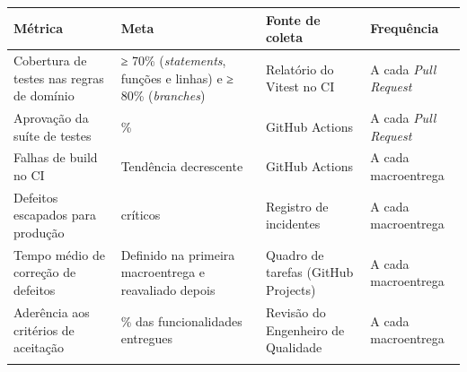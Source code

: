 {\footnotesize
\begin{tabularx}{\textwidth}{>{\hsize=1.229\hsize\sloppy\arraybackslash}X >{\hsize=1.127\hsize\sloppy\arraybackslash}X >{\hsize=0.917\hsize\sloppy\arraybackslash}X >{\hsize=0.726\hsize\sloppy\arraybackslash}X}
\arrayrulecolor{GithubTableBorder}\toprule
\rowcolor{BrandTableHeader}
\textbf{Métrica} & \textbf{Meta} & \textbf{Fonte de coleta} & \textbf{Frequência} \\
\midrule
\arrayrulecolor{BrandGrayRule}
Cobertura de testes nas regras de domínio & ≥ 70\% (\emph{statements}, funções e linhas) e ≥ 80\% (\emph{branches}) & Relatório do Vitest no CI & A cada \emph{Pull Request} \\
\midrule
Aprovação da suíte de testes & 100\% & GitHub Actions & A cada \emph{Pull Request} \\
\midrule
Falhas de build no CI & Tendência decrescente & GitHub Actions & A cada macroentrega \\
\midrule
Defeitos escapados para produção & 0 críticos & Registro de incidentes & A cada macroentrega \\
\midrule
Tempo médio de correção de defeitos & Definido na primeira macroentrega e reavaliado depois & Quadro de tarefas (GitHub Projects) & A cada macroentrega \\
\midrule
Aderência aos critérios de aceitação & 100\% das funcionalidades entregues & Revisão do Engenheiro de Qualidade & A cada macroentrega \\
\arrayrulecolor{GithubTableBorder}\bottomrule
\end{tabularx}%
}
